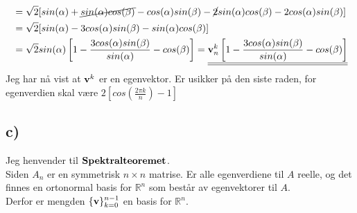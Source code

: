 \documentclass[a4paper,12pt,norsk]{article}
\begin{document}
\begin{align*}
&= \sqrt{2}[sin(\alpha) + \cancel{sin(\alpha)cos(\beta)} -cos(\alpha)sin(\beta) -\cancel{2}sin(\alpha)cos(\beta) -2cos(\alpha)sin(\beta)]\\
&= \sqrt{2}[sin(\alpha) - 3cos(\alpha)sin(\beta) - sin(\alpha)cos(\beta)]\\
&= \sqrt{2}sin(\alpha)\left[1 - \frac{3cos(\alpha)sin(\beta)}{sin(\alpha)} -cos(\beta)\right] 
= \underline{\underline{\bold{v}^k_n\left[1 - \frac{3cos(\alpha)sin(\beta)}{sin(\alpha)} -cos(\beta)\right] }}
\end{align*}
Jeg har nå vist at $\bold{v}^k$ er en egenvektor. Er usikker på den siste raden, for egenverdien skal være $2\left[cos\left(\frac{2\pi k}{n}\right) - 1\right]$

\subsection{c)}
Jeg henvender til $\bold{Spektralteoremet}$.\\
Siden $A_n$ er en symmetrisk $n\times n$ matrise. Er alle egenverdiene til $A$ reelle, og det finnes en ortonormal basis for $\mathbb{R}^n$ som består av egenvektorer til $A$.\\
Derfor er mengden $\{\bold{v}\}^{n-1}_{k=0}$ en basis for $\mathbb{R}^n$.
\end{document}
